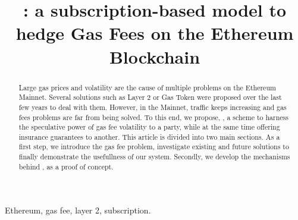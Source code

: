 
    


\title{\projectName : a subscription-based model to hedge Gas Fees on the Ethereum Blockchain\\
}

\author{
\and
{}
\and
{}
\and
{}

}

\maketitle
\thispagestyle{plain}
\pagestyle{plain}

\begin{abstract}
Large gas prices and volatility are the cause of multiple problems on the Ethereum Mainnet. Several solutions such as Layer 2 or Gas Token were proposed over the last few years to deal with them. However, in the Mainnet, traffic keeps increasing and gas fees problems are far from being solved. To this end, we propose, \projectName, a scheme to harness the speculative power of gas fee volatility to a party, while at the same time offering insurance guarantees to another. 
This article is divided into two main sections. As a first step, we introduce the gas fee problem, investigate existing and future solutions to finally demonstrate the usefullness of our system. Secondly, we develop the mechanisms behind \projectName, as a proof of concept. 
\end{abstract}

\begin{IEEEkeywords}
Ethereum, gas fee, layer 2, subscription.
\end{IEEEkeywords}